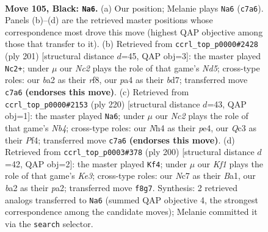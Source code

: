 \documentclass[11pt]{article}
\begin{document}
\clearpage

\begin{figure}[p]\centering
\begin{subfigure}{0.46\textwidth}\centering
\resizebox{\linewidth}{!}{%
\newchessgame
\chessboard[
  setfen={5k2/1Nn5/8/8/Pp2P2n/2q5/B4b1p/3K4 b - - 3 105},
  showmover=false,
  pgfstyle=straightmove, color=movearrow, markmove={c7-a6}
]}
\caption{}
\end{subfigure}\hfill
\begin{subfigure}{0.46\textwidth}\centering
\resizebox{\linewidth}{!}{%
\newchessgame
\chessboard[
  setfen={5R2/3B4/3p4/2p1b3/2Pn4/4K3/6k1/8 b - - 15 101},
  showmover=false,
  pgfstyle=straightmove, color=movearrow, markmove={d4-c2}
]}
\caption{}
\end{subfigure}
\\[4pt]
\begin{subfigure}{0.46\textwidth}\centering
\resizebox{\linewidth}{!}{%
\newchessgame
\chessboard[
  setfen={8/5k2/8/1p5p/1N2pP2/Pb2P2K/8/8 w - - 90 111},
  showmover=false,
  pgfstyle=straightmove, color=movearrow, markmove={b4-a6}
]}
\caption{}
\end{subfigure}\hfill
\begin{subfigure}{0.46\textwidth}\centering
\resizebox{\linewidth}{!}{%
\newchessgame
\chessboard[
  setfen={8/3b4/4PQ2/2PP3k/8/4K3/p7/B7 w - - 5 101},
  showmover=false,
  pgfstyle=straightmove, color=movearrow, markmove={e3-f4}
]}
\caption{}
\end{subfigure}
\caption{\textbf{Move 105, Black: \texttt{Na6}.} (a) Our position; Melanie plays \texttt{Na6} (\texttt{c7a6}). Panels (b)--(d) are the retrieved master positions whose correspondence most drove this move (highest QAP objective among those that transfer to it). (b) Retrieved from \texttt{ccrl\_top\_p0000\#2428} (ply 201) [structural distance $d$=45, QAP obj=3]: the master played \texttt{Nc2+}; under $\mu$ our \emph{Nc2} plays the role of that game's \emph{Nd5}; cross-type roles: our \emph{b}a2 as their \emph{r}f8, our \emph{p}a4 as their \emph{b}d7; transferred move \texttt{c7a6} \textbf{(endorses this move)}. (c) Retrieved from \texttt{ccrl\_top\_p0000\#2153} (ply 220) [structural distance $d$=43, QAP obj=1]: the master played \texttt{Na6}; under $\mu$ our \emph{Nc2} plays the role of that game's \emph{Nb4}; cross-type roles: our \emph{N}h4 as their \emph{p}e4, our \emph{Q}c3 as their \emph{P}f4; transferred move \texttt{c7a6} \textbf{(endorses this move)}. (d) Retrieved from \texttt{ccrl\_top\_p0003\#378} (ply 200) [structural distance $d$=42, QAP obj=2]: the master played \texttt{Kf4}; under $\mu$ our \emph{Kf1} plays the role of that game's \emph{Ke3}; cross-type roles: our \emph{N}c7 as their \emph{B}a1, our \emph{b}a2 as their \emph{p}a2; transferred move \texttt{f8g7}. Synthesis: 2 retrieved analogs transferred to \texttt{Na6} (summed QAP objective 4, the strongest correspondence among the candidate moves); Melanie committed it via the \texttt{search} selector.}
\label{fig:thought-m209}
\end{figure}
\end{document}

